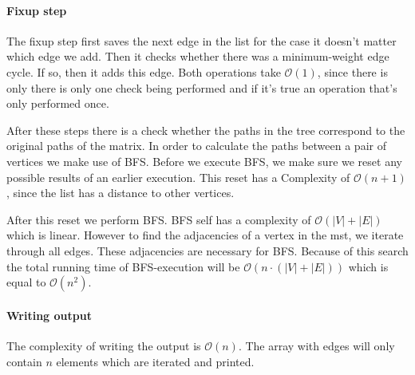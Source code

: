 \documentclass{article}
\newcommand{\bigO}[1]{\mathcal{O}(#1)}
\begin{document}
\paragraph{Fixup step} The fixup step first saves the next edge in the list for the case it doesn't matter which edge we add. Then it checks whether there was a minimum-weight edge cycle. If so, then it adds this edge. Both operations take $\bigO{1}$, since there is only there is only one check being performed and if it's true an operation that's only performed once.

After these steps there is a check whether the paths in the tree correspond to the original paths of the matrix. In order to calculate the paths between a pair of vertices we make use of BFS. Before we execute BFS, we make sure we reset any possible results of an earlier execution. This reset has a Complexity of $\bigO{n + 1}$, since the list has a distance to other vertices.

After this reset we perform BFS. BFS self has a complexity of $\bigO{|V| + |E|}$ which is linear. However to find the adjacencies of a vertex in the mst, we iterate through all edges. These adjacencies are necessary for BFS. Because of this search the total running time of BFS-execution will be $\bigO{n \cdot (|V| + |E|)}$ which is equal to $\bigO{n^2}$.

\paragraph{Writing output}
The complexity of writing the output is $\bigO{n}$. The array with edges will only contain $n$ elements which are iterated and printed.
\end{document}
